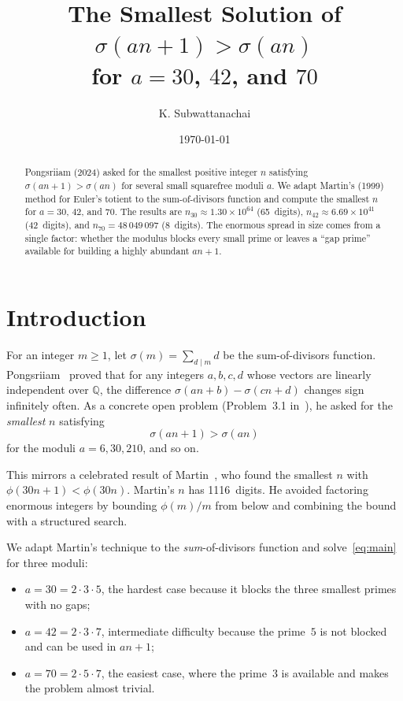 \documentclass[12pt]{amsart}
\title{The Smallest Solution of $\sigma(an+1) > \sigma(an)$\\
for $a = 30$, $42$, and $70$}
\author{K. Subwattanachai}
\date{\today}
\theoremstyle{definition}
\begin{document}
\begin{abstract}
Pongsriiam (2024) asked for the smallest positive integer $n$ satisfying
$\sigma(an+1) > \sigma(an)$ for several small squarefree moduli $a$.
We adapt Martin's (1999) method for Euler's totient to the sum-of-divisors
function and compute the smallest $n$ for $a = 30$, $42$, and $70$.
The results are $n_{30} \approx 1.30 \times 10^{64}$ (65~digits),
$n_{42} \approx 6.69 \times 10^{41}$ (42~digits), and
$n_{70} = 48\,049\,097$ (8~digits).
The enormous spread in size comes from a single factor: whether the modulus
blocks every small prime or leaves a ``gap prime'' available for building
a highly abundant $an+1$.
\end{abstract}

\maketitle

\section{Introduction}

For an integer $m \ge 1$, let $\sigma(m) = \sum_{d \mid m} d$ be the
sum-of-divisors function.  Pongsriiam~\cite{pongsriiam} proved that for any
integers $a,b,c,d$ whose vectors are linearly independent over $\mathbb{Q}$,
the difference $\sigma(an+b) - \sigma(cn+d)$ changes sign infinitely often.
As a concrete open problem (Problem~3.1 in~\cite{pongsriiam}), he asked for
the \emph{smallest} $n$ satisfying
\begin{equation}\label{eq:main}
\sigma(an+1) > \sigma(an)
\end{equation}
for the moduli $a = 6, 30, 210$, and so on.

This mirrors a celebrated result of Martin~\cite{martin}, who found the
smallest $n$ with $\phi(30n+1) < \phi(30n)$.  Martin's $n$ has 1116~digits.
He avoided factoring enormous integers by bounding $\phi(m)/m$ from below
and combining the bound with a structured search.

We adapt Martin's technique to the \emph{sum}-of-divisors function and
solve~\eqref{eq:main} for three moduli:
\begin{itemize}
  \item $a = 30 = 2 \cdot 3 \cdot 5$, the hardest case because it blocks the
        three smallest primes with no gaps;
  \item $a = 42 = 2 \cdot 3 \cdot 7$, intermediate difficulty because the
        prime~$5$ is not blocked and can be used in $an+1$;
  \item $a = 70 = 2 \cdot 5 \cdot 7$, the easiest case, where the prime~$3$
        is available and makes the problem almost trivial.
\end{itemize}
\end{document}
